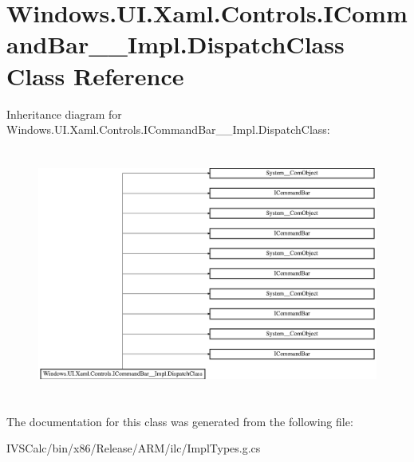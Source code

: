 \hypertarget{class_windows_1_1_u_i_1_1_xaml_1_1_controls_1_1_i_command_bar_____impl_1_1_dispatch_class}{}\section{Windows.\+U\+I.\+Xaml.\+Controls.\+I\+Command\+Bar\+\_\+\+\_\+\+Impl.\+Dispatch\+Class Class Reference}
\label{class_windows_1_1_u_i_1_1_xaml_1_1_controls_1_1_i_command_bar_____impl_1_1_dispatch_class}
Inheritance diagram for Windows.\+U\+I.\+Xaml.\+Controls.\+I\+Command\+Bar\+\_\+\+\_\+\+Impl.\+Dispatch\+Class\+:\begin{figure}[H]
\begin{center}
\leavevmode
\includegraphics[height=8.324325cm]{class_windows_1_1_u_i_1_1_xaml_1_1_controls_1_1_i_command_bar_____impl_1_1_dispatch_class}
\end{center}
\end{figure}


The documentation for this class was generated from the following file\+:\begin{DoxyCompactItemize}
\item 
I\+V\+S\+Calc/bin/x86/\+Release/\+A\+R\+M/ilc/Impl\+Types.\+g.\+cs\end{DoxyCompactItemize}
